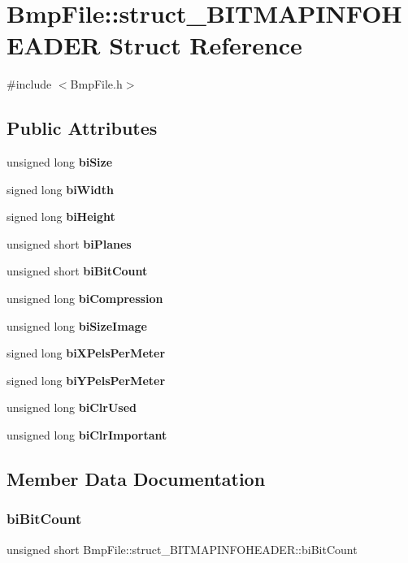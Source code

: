 \section{Bmp\+File\+:\+:struct\+\_\+\+B\+I\+T\+M\+A\+P\+I\+N\+F\+O\+H\+E\+A\+D\+ER Struct Reference}
\label{structBmpFile_1_1struct__BITMAPINFOHEADER}


{\ttfamily \#include $<$Bmp\+File.\+h$>$}

\subsection*{Public Attributes}
\begin{DoxyCompactItemize}
\item 
unsigned long \textbf{ bi\+Size}
\item 
signed long \textbf{ bi\+Width}
\item 
signed long \textbf{ bi\+Height}
\item 
unsigned short \textbf{ bi\+Planes}
\item 
unsigned short \textbf{ bi\+Bit\+Count}
\item 
unsigned long \textbf{ bi\+Compression}
\item 
unsigned long \textbf{ bi\+Size\+Image}
\item 
signed long \textbf{ bi\+X\+Pels\+Per\+Meter}
\item 
signed long \textbf{ bi\+Y\+Pels\+Per\+Meter}
\item 
unsigned long \textbf{ bi\+Clr\+Used}
\item 
unsigned long \textbf{ bi\+Clr\+Important}
\end{DoxyCompactItemize}


\subsection{Member Data Documentation}
\mbox{\label{structBmpFile_1_1struct__BITMAPINFOHEADER_a21a955a78361f39f075180f9539f2a4f}} 
\subsubsection{bi\+Bit\+Count}
{\footnotesize\ttfamily unsigned short Bmp\+File\+::struct\+\_\+\+B\+I\+T\+M\+A\+P\+I\+N\+F\+O\+H\+E\+A\+D\+E\+R\+::bi\+Bit\+Count}

